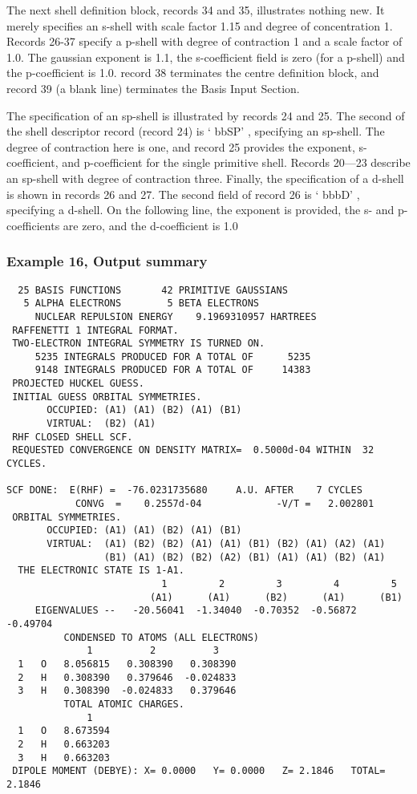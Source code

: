 The next shell definition block, records 34 and 35, illustrates nothing
new.  It merely specifies an s-shell with scale factor 1.15 and degree
of concentration 1.
Records 26-37 specify a p-shell with degree of contraction 1 and a scale
factor of 1.0.  The gaussian exponent is 1.1, the s-coefficient field
is zero (for a p-shell) and the p-coefficient is 1.0.  record 38
terminates the centre definition block, and record 39 (a blank line)
terminates the Basis Input Section.

The specification of an sp-shell is illustrated by records 24 and 25.  The
second of the shell descriptor record (record 24) is ` bbSP' , 
specifying an sp-shell.
The degree of contraction here is one, and record 25 provides the exponent,
s-coefficient, and p-coefficient for the single primitive shell.  Records
20---23 describe an sp-shell with degree of contraction three.
Finally, the specification of a d-shell is shown in records 26 and 27.  
The
second field of record 26 is ` bbbD' , specifying a d-shell.  
On the following
line, the exponent is provided, the s- and p- coefficients are zero, and the
d-coefficient is 1.0
\newpage
\subsubsection{\sf Example 16, Output summary}
{\small
\begin{verbatim}
  25 BASIS FUNCTIONS       42 PRIMITIVE GAUSSIANS
   5 ALPHA ELECTRONS        5 BETA ELECTRONS
     NUCLEAR REPULSION ENERGY    9.1969310957 HARTREES
 RAFFENETTI 1 INTEGRAL FORMAT.
 TWO-ELECTRON INTEGRAL SYMMETRY IS TURNED ON.
     5235 INTEGRALS PRODUCED FOR A TOTAL OF      5235
     9148 INTEGRALS PRODUCED FOR A TOTAL OF     14383
 PROJECTED HUCKEL GUESS.
 INITIAL GUESS ORBITAL SYMMETRIES.
       OCCUPIED: (A1) (A1) (B2) (A1) (B1)
       VIRTUAL:  (B2) (A1)
 RHF CLOSED SHELL SCF.
 REQUESTED CONVERGENCE ON DENSITY MATRIX=  0.5000d-04 WITHIN  32 CYCLES.

SCF DONE:  E(RHF) =  -76.0231735680     A.U. AFTER    7 CYCLES
            CONVG  =    0.2557d-04             -V/T =   2.002801
 ORBITAL SYMMETRIES.
       OCCUPIED: (A1) (A1) (B2) (A1) (B1)
       VIRTUAL:  (A1) (B2) (B2) (A1) (A1) (B1) (B2) (A1) (A2) (A1)
                 (B1) (A1) (B2) (B2) (A2) (B1) (A1) (A1) (B2) (A1)
  THE ELECTRONIC STATE IS 1-A1.
                           1         2         3         4         5
                         (A1)      (A1)      (B2)      (A1)      (B1)
     EIGENVALUES --   -20.56041  -1.34040  -0.70352  -0.56872  -0.49704
          CONDENSED TO ATOMS (ALL ELECTRONS)
              1          2          3
  1   O   8.056815   0.308390   0.308390
  2   H   0.308390   0.379646  -0.024833
  3   H   0.308390  -0.024833   0.379646
          TOTAL ATOMIC CHARGES.
              1
  1   O   8.673594
  2   H   0.663203
  3   H   0.663203
 DIPOLE MOMENT (DEBYE): X= 0.0000   Y= 0.0000   Z= 2.1846   TOTAL= 2.1846
\end{verbatim}
}
\newpage

